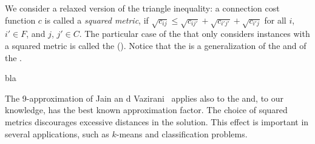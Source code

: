 We consider a relaxed version of the triangle inequality: a connection cost
function $c$ is called a \emph{squared metric}, if
$\sqrt{c_{ij}}\leq\sqrt{c_{ij'}} + \sqrt{c_{i'j'}} + \sqrt{c_{i'j}}$ for all
$i$, $i' \in F$, and $j$, $j' \in C$. The particular case of the \flp that only
considers instances with a squared metric is called the \squmetfacloc (\smflp).
Notice that the \smflp is a generalization of the \seflp and of the \mflp.

bla

The 9-approximation of Jain an d Vazirani~\cite{JainV01} applies also to the
\smflp and, to our knowledge, has the best known approximation factor. The
choice of squared metrics discourages excessive distances in the solution. This
effect is important in several applications, such as $k$-means and
classification problems.

